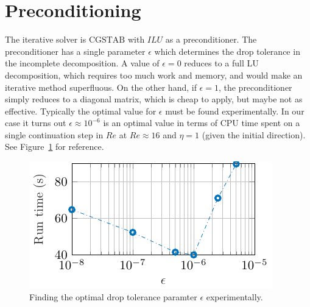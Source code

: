 \section{Preconditioning}

The iterative solver is $\textrm{CGSTAB}$ with $ILU$ as a preconditioner. The preconditioner has a single parameter $\epsilon$ which determines the drop tolerance in the incomplete decomposition. A value of $\epsilon = 0$ reduces to a full LU decomposition, which requires too much work and memory, and would make an iterative method superfluous. On the other hand, if $\epsilon = 1$, the preconditioner simply reduces to a diagonal matrix, which is cheap to apply, but maybe not as effective. Typically the optimal value for $\epsilon$ must be found experimentally. In our case it turns out $\epsilon \approx 10^{-6}$ is an optimal value in terms of CPU time spent on a single continuation step in $Re$ at $Re \approx 16$ and $\eta = 1$ (given the initial direction). See Figure~\ref{fig:optimal_epsilon} for reference.

\begin{figure}[h]
    \centering
    \includegraphics{images/droptol_epsilon.pdf}
    \caption{Finding the optimal drop tolerance paramter $\epsilon$ experimentally.}
    \label{fig:optimal_epsilon}
\end{figure}
